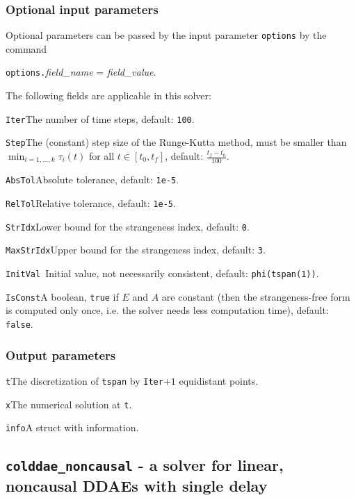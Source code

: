\documentclass[final,reqno]{siamltex}
\renewenvironment{itemize}[1]{\begin{compactitem}#1}{\end{compactitem}}
\begin{document}
\subsubsection{Optional input parameters}
Optional parameters can be passed by the input parameter {\tt options} by the command 
\begin{center}
{\tt options.}{\it field\_name} = {\it field\_value}.
\end{center}
The following fields are applicable in this solver:
\begin{itemize}
\item {\tt Iter}\quad        The number of time steps, default: {\tt 100}.
\item {\tt Step}\quad        The (constant) step size of the Runge-Kutta method, must be smaller than
          $\min_{i=1,\ldots,k}\tau_i(t)$ for all $t\in[t_0,t_f]$, default: $\frac{t_f-t_0}{100}$.
\item {\tt AbsTol}\quad       Absolute tolerance, default:  {\tt 1e-5}.
\item {\tt RelTol}\quad       Relative tolerance, default:  {\tt 1e-5}.
\item {\tt StrIdx}\quad       Lower bound for the strangeness index,  default: {\tt 0}.
\item {\tt MaxStrIdx}\quad    Upper bound for the strangeness index,  default: {\tt 3}.
\item {\tt InitVal  }\quad    Initial value, not necessarily consistent,  default: {\tt phi(tspan(1))}.
\item {\tt IsConst}\quad      A boolean, {\tt true} if $E$ and $A$ are constant (then the strangeness-free form is computed only once, i.e. the solver needs less computation time), default: {\tt false}.
\end{itemize}

\subsubsection{Output parameters}
\begin{itemize}
\item {\tt t}\quad The discretization of {\tt tspan} by {\tt Iter}$+1$ equidistant points.
\item {\tt x}\quad The numerical solution at {\tt t}.
\item {\tt info}\quad A struct with information.
\end{itemize}


\subsection{{\tt colddae\_noncausal} - a solver for linear, noncausal DDAEs with single delay}
\end{document}
